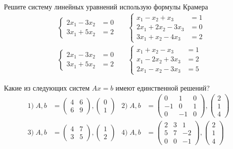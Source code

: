 \begin{exercise}
Решите систему линейных уравнений использую формулы Крамера
\begin{align*}
	&\left\{\begin{aligned}
		2x_1-3x_2&=0 \\ 3x_1+5x_2 &= 2
	\end{aligned}\right. & 
	&\left\{\begin{aligned}
		x_1-x_2+x_3&=1 \\ 2x_1+2x_2-3x_3 &= 0 \\
		3x_1+x_2-4x_3 &= 2
	\end{aligned}\right. \\
	&\left\{\begin{aligned}
		2x_1-3x_2&=0 \\ 3x_1+5x_2 &= 2
	\end{aligned}\right. &
	&\left\{\begin{aligned}
		x_1+x_2-x_3&=1 \\ x_1-2x_2+3x_3 &= 2 \\
		2x_1-x_2-3x_3 &= 5
	\end{aligned}\right.
\end{align*}
\end{exercise}

\begin{exercise}
Какие из следующих систем \(Ax=b\) имеют единственной решений?
\begin{align*}
	1)\;A,b&=\begin{pmatrix}
		4 & 6  \\ 6 & 9 
	\end{pmatrix}, \begin{pmatrix}
		0 \\ 1 
	\end{pmatrix} &
	2)\;A,b&=\begin{pmatrix}
		0 & 1 & 0 \\ -1 & 0 & 1 \\ 0 & -1 & 0
	\end{pmatrix}, \begin{pmatrix}
		2 \\ 1 \\ 4
	\end{pmatrix} \\
	3)\;A,b&=\begin{pmatrix}
		4 & 7  \\ 3 & 5
	\end{pmatrix}, \begin{pmatrix}
		1 \\ 2 
	\end{pmatrix} &
	4)\;A,b&=\begin{pmatrix}
		2 & 3 & 1 \\ 5 & 7 & -2 \\ 0 & 0 & -1
	\end{pmatrix}, \begin{pmatrix}
		2 \\ 1 \\ 4
	\end{pmatrix}
\end{align*}
\end{exercise}